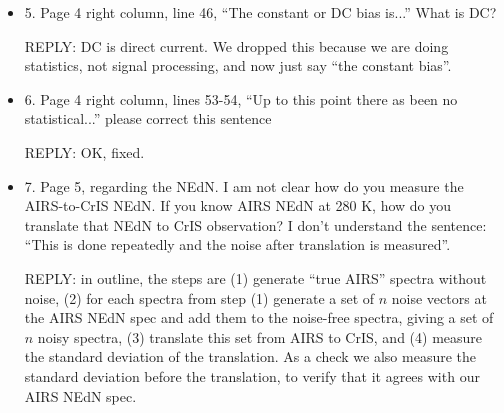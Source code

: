 \documentclass[11pt]{article}
\newcommand {\reply} {\mbox{\small REPLY}}
\begin{document}
\begin{itemize}
    \reply: The direct convolution is reference truth for the
    deconvolution, and is now labeled ``decon ref'' in the plots.
    We choose 2000 because this is an approximate match to the
    resolving power of the deconvolution.  Resolving power of the
    deconvolution is a property of the deconvolution---we just want
    to measure it.  We compared the deconvolution with reference
    truth for a range of resolving powers from 1200 to 2400 and
    chose 2000 because the residuals do not decrease much beyond
    that point.

    We don't use the Gaussian basis for the AIRS deconvolution or
    the AIRS to CrIS translation---it is just a measure to see how
    well the deconvolution step alone works.  The deconvolution
    reference truth for a resolving power of 1200 is a very close
    match to the original AIRS radiances.

  \item 5. Page 4 right column, line 46, ``The constant or DC bias
    is...''  What is DC?

    \reply: DC is direct current.  We dropped this because we are
    doing statistics, not signal processing, and now just say ``the
    constant bias''.

  \item 6. Page 4 right column, lines 53-54, ``Up to this point
    there as been no statistical...'' please correct this sentence

    \reply: OK, fixed.

  \item 7. Page 5, regarding the NEdN. I am not clear how do you
    measure the AIRS-to-CrIS NEdN. If you know AIRS NEdN at 280 K,
    how do you translate that NEdN to CrIS observation? I don’t
    understand the sentence: ``This is done repeatedly and the noise
    after translation is measured''.

    \reply: in outline, the steps are (1) generate ``true AIRS''
    spectra without noise, (2) for each spectra from step (1)
    generate a set of $n$ noise vectors at the AIRS NEdN spec and
    add them to the noise-free spectra, giving a set of $n$ noisy
    spectra, (3) translate this set from AIRS to CrIS, and (4)
    measure the standard deviation of the translation.  As a check
    we also measure the standard deviation before the translation,
    to verify that it agrees with our AIRS NEdN spec.

\end{itemize}
\end{document}
